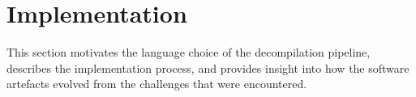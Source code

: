 
%
%
%
%
%
%





\section{Implementation}
\label{sec:implementation}

This section motivates the language choice of the decompilation pipeline, describes the implementation process, and provides insight into how the software artefacts evolved from the challenges that were encountered.







